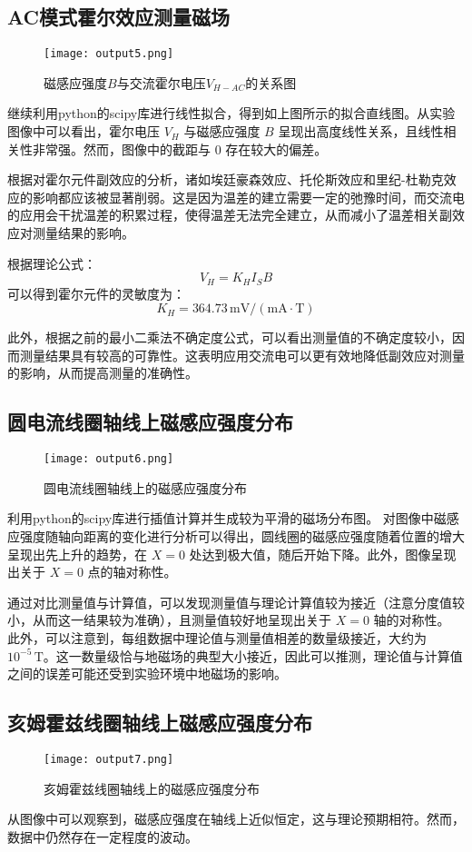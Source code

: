 \documentclass[UTF-8,twoside,cs4size]{ctexart}
\begin{document}
\subsection{AC模式霍尔效应测量磁场}
\begin{figure}[!h]
    \centering
    \texttt{[image: output5.png]}
    \caption{磁感应强度$B$与交流霍尔电压$V_{H-AC}$的关系图}
\end{figure}
继续利用python的scipy库进行线性拟合，得到如上图所示的拟合直线图。从实验图像中可以看出，霍尔电压 $V_H$ 与磁感应强度 $B$ 呈现出高度线性关系，且线性相关性非常强。然而，图像中的截距与 0 存在较大的偏差。 \par

根据对霍尔元件副效应的分析，诸如埃廷豪森效应、托伦斯效应和里纪-杜勒克效应的影响都应该被显著削弱。这是因为温差的建立需要一定的弛豫时间，而交流电的应用会干扰温差的积累过程，使得温差无法完全建立，从而减小了温差相关副效应对测量结果的影响。 \par

根据理论公式：
\[
V_H = K_H I_S B
\]
可以得到霍尔元件的灵敏度为：
\[
K_H = 364.73 \, \mathrm{mV/(mA \cdot T)}
\]

此外，根据之前的最小二乘法不确定度公式，可以看出测量值的不确定度较小，因而测量结果具有较高的可靠性。这表明应用交流电可以更有效地降低副效应对测量的影响，从而提高测量的准确性。
\subsection{圆电流线圈轴线上磁感应强度分布}
\begin{figure}[!h]
    \centering
    \texttt{[image: output6.png]}
    \caption{圆电流线圈轴线上的磁感应强度分布}
\end{figure}
利用python的scipy库进行插值计算并生成较为平滑的磁场分布图。
对图像中磁感应强度随轴向距离的变化进行分析可以得出，圆线圈的磁感应强度随着位置的增大呈现出先上升的趋势，在 $X = 0$ 处达到极大值，随后开始下降。此外，图像呈现出关于 $X = 0$ 点的轴对称性。 \par

通过对比测量值与计算值，可以发现测量值与理论计算值较为接近（注意分度值较小，从而这一结果较为准确），且测量值较好地呈现出关于 $X = 0$ 轴的对称性。
此外，可以注意到，每组数据中理论值与测量值相差的数量级接近，大约为 $10^{-5} \, \mathrm{T}$。这一数量级恰与地磁场的典型大小接近，因此可以推测，理论值与计算值之间的误差可能还受到实验环境中地磁场的影响。

\subsection{亥姆霍兹线圈轴线上磁感应强度分布}
\begin{figure}[!h]
    \centering
    \texttt{[image: output7.png]}
    \caption{亥姆霍兹线圈轴线上的磁感应强度分布}
\end{figure}
从图像中可以观察到，磁感应强度在轴线上近似恒定，这与理论预期相符。然而，数据中仍然存在一定程度的波动。 \par
\end{document}

